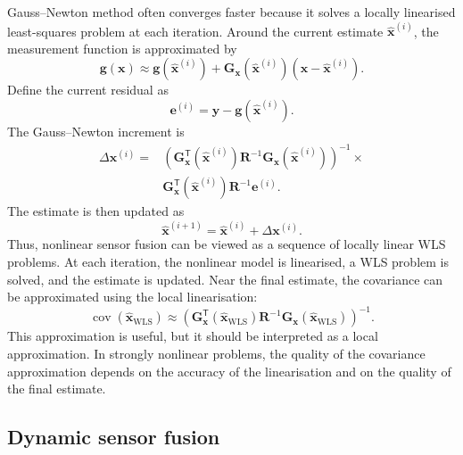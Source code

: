 Gauss--Newton method often converges faster because it solves a locally linearised least-squares problem at each iteration. Around the current estimate $\widehat{\mathbf{x}}^{(i)}$, the measurement function is approximated by
\begin{equation}
\mathbf{g}(\mathbf{x}) \approx \mathbf{g} \left( \widehat{\mathbf{x}}^{(i)} \right) + \mathbf{G}_{\mathbf{x}} \left( \widehat{\mathbf{x}}^{(i)} \right) \left( \mathbf{x} - \widehat{\mathbf{x}}^{(i)} \right).
\end{equation}
Define the current residual as
\begin{equation}
\mathbf{e}^{(i)} = \mathbf{y} - \mathbf{g} \left( \widehat{\mathbf{x}}^{(i)} \right).
\end{equation}
The Gauss--Newton increment is
\begin{align}
\Delta \mathbf{x}^{(i)} = &\left(
\mathbf{G}_{\mathbf{x}}^{\mathsf T}
\left(
\widehat{\mathbf{x}}^{(i)}
\right)
\mathbf{R}^{-1}
\mathbf{G}_{\mathbf{x}}
\left(
\widehat{\mathbf{x}}^{(i)}
\right)
\right)^{-1} \times \nonumber \\
&\mathbf{G}_{\mathbf{x}}^{\mathsf T}
\left(
\widehat{\mathbf{x}}^{(i)}
\right)
\mathbf{R}^{-1}
\mathbf{e}^{(i)}.
\end{align}
The estimate is then updated as
\begin{equation}
\widehat{\mathbf{x}}^{(i+1)} = \widehat{\mathbf{x}}^{(i)} + \Delta \mathbf{x}^{(i)}.
\end{equation}
Thus, nonlinear sensor fusion can be viewed as a sequence of locally linear WLS problems. At each iteration, the nonlinear model is linearised, a WLS problem is solved, and the estimate is updated. Near the final estimate, the covariance can be approximated using the local linearisation:
\begin{equation}
\operatorname{cov} \left( \widehat{\mathbf{x}}_{\mathrm{WLS}} \right) \approx \left(\mathbf{G}_{\mathbf{x}}^{\mathsf T}\left(\widehat{\mathbf{x}}_{\mathrm{WLS}}\right) \mathbf{R}^{-1} \mathbf{G}_{\mathbf{x}} \left( \widehat{\mathbf{x}}_{\mathrm{WLS}} \right)\right)^{-1}.
\end{equation}
This approximation is useful, but it should be interpreted as a local approximation. In strongly nonlinear problems, the quality of the covariance approximation depends on the accuracy of the linearisation and on the quality of the final estimate.

\subsection{Dynamic sensor fusion}

